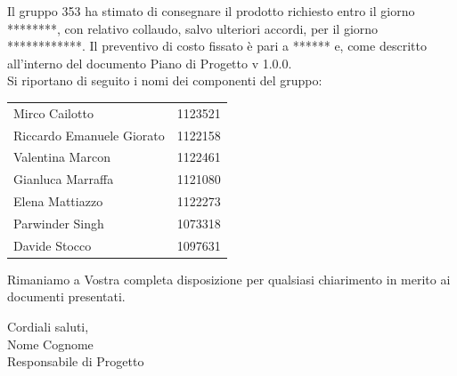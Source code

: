 \documentclass[openany, a4paper, 12pt]{letter}
\begin{document}
\begin{letter}
			Il gruppo 353 ha stimato di consegnare il prodotto richiesto entro il giorno ********,
			con relativo collaudo, salvo ulteriori accordi, per il giorno ************. Il preventivo di costo
			fissato è pari a ****** e, come descritto all'interno del documento Piano di Progetto v 1.0.0.%
			\medskip \\
			Si riportano di seguito i nomi dei componenti del gruppo:\\
			\begin{center}
				\begin{tabular}{|l r|}
					Mirco Cailotto & 1123521\\
					Riccardo Emanuele Giorato & 1122158\\
					Valentina Marcon & 1122461\\
					Gianluca Marraffa & 1121080\\
					Elena Mattiazzo & 1122273\\
					Parwinder Singh & 1073318\\
					Davide Stocco & 1097631\\
				\end{tabular}
			\end{center}
		Rimaniamo a Vostra completa disposizione per qualsiasi chiarimento in merito ai documenti presentati.
		\begin{flushleft}
		Cordiali saluti,\\
		Nome Cognome\\ %
		Responsabile di Progetto
		\end{flushleft}
		\end{letter}
	
\end{document}
